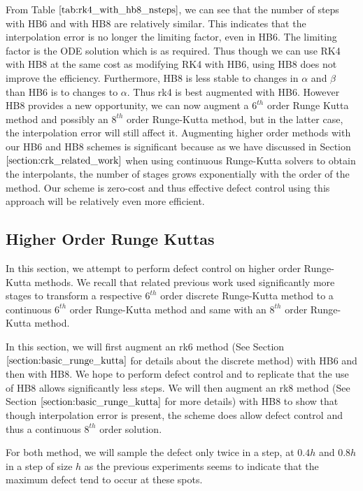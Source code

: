 \documentclass{article}
\begin{document}
From Table $\ref{tab:rk4_with_hb8_nsteps}$, we can see that the number of steps with HB6 and with HB8 are relatively similar. This indicates that the interpolation error is no longer the limiting factor, even in HB6. The limiting factor is the ODE solution which is as required. Thus though we can use RK4 with HB8 at the same cost as modifying RK4 with HB6, using HB8 does not improve the efficiency. Furthermore, HB8 is less stable to changes in $\alpha$ and $\beta$ than HB6 is to changes to $\alpha$. Thus rk4 is best augmented with HB6. However HB8 provides a new opportunity, we can now augment a $6^{th}$ order Runge Kutta method and possibly an $8^{th}$ order Runge-Kutta method, but in the latter case, the interpolation error will still affect it. Augmenting higher order methods with our HB6 and HB8 schemes is significant because as we have discussed in Section $\ref{section:crk_related_work}$ when using continuous Runge-Kutta solvers to obtain the interpolants, the number of stages grows exponentially with the order of the method. Our scheme is zero-cost and thus effective defect control using this approach will be relatively even more efficient.


\subsection{Higher Order Runge Kuttas}
\label{section:HBs_and_higher_order_RK}
In this section, we attempt to perform defect control on higher order Runge-Kutta methods. We recall that related previous work used significantly more stages to transform a respective $6^{th}$ order discrete Runge-Kutta method to a continuous $6^{th}$ order Runge-Kutta method and same with an $8^{th}$ order Runge-Kutta method.

In this section, we will first augment an rk6 method (See Section $\ref{section:basic_runge_kutta}$ for details about the discrete method) with HB6 and then with HB8. We hope to perform defect control and to replicate that the use of HB8 allows significantly less steps. We will then augment an rk8 method (See Section $\ref{section:basic_runge_kutta}$ for more details) with HB8 to show that though interpolation error is present, the scheme does allow defect control and thus a continuous $8^{th}$ order solution. 

For both method, we will sample the defect only twice in a step, at $0.4h$ and $0.8h$ in a step of size $h$ as the previous experiments seems to indicate that the maximum defect tend to occur at these spots.
\end{document}
